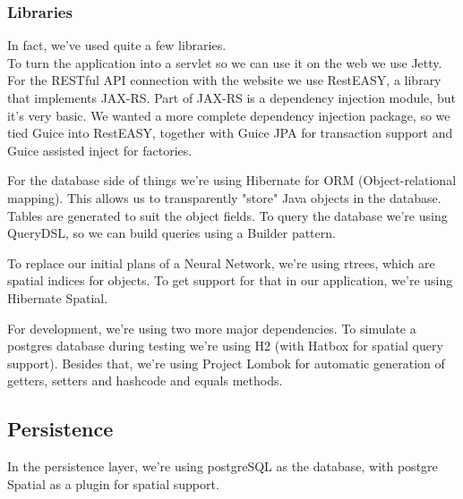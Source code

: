 \subsubsection{Libraries}
In fact, we've used quite a few libraries.\\
To turn the application into a servlet so we can use it on the web we use Jetty.
For the RESTful API connection with the website we use RestEASY, a library that implements JAX-RS.
Part of JAX-RS is a dependency injection module, but it's very basic.
We wanted a more complete dependency injection package, so we tied Guice into RestEASY, together with Guice JPA for transaction support and Guice assisted inject for factories.

For the database side of things we're using Hibernate for ORM (Object-relational mapping).
This allows us to transparently "store" Java objects in the database.
Tables are generated to suit the object fields.
To query the database we're using QueryDSL, so we can build queries using a Builder pattern.

To replace our initial plans of a Neural Network, we're using rtrees, which are spatial indices for objects.
To get support for that in our application, we're using Hibernate Spatial.

For development, we're using two more major dependencies.
To simulate a postgres database during testing we're using H2 (with Hatbox for spatial query support).
Besides that, we're using Project Lombok for automatic generation of getters, setters and hashcode and equals methods.

\subsection{Persistence}
In the persistence layer, we're using postgreSQL as the database, with postgre Spatial as a plugin for spatial support.

